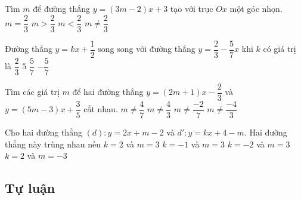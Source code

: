 \begin{bt}%
	Tìm $m$ để đường thẳng $y=(3m-2)x+3$ tạo với trục $Ox$ một góc nhọn.
	\choice
	{$m=\dfrac{2}{3}$}
	{\True $m>\dfrac{2}{3}$}
	{$m<\dfrac{2}{3}$}
	{$m \ne \dfrac{2}{3}$}
\end{bt}

\begin{bt}%
	Đường thẳng $y=kx+\dfrac{1}{2}$ song song với đường thẳng $y=\dfrac{2}{3}-\dfrac{5}{7}x$ khi $k$ có giá trị là
	\choice
	{$\dfrac{2}{3}$}
	{$5$}
	{$\dfrac{5}{7}$}
	{\True $-\dfrac{5}{7}$}
\end{bt}


\begin{bt}%
	Tìm các giá trị $m$ để hai đường thẳng $y=(2m+1)x-\dfrac{2}{3}$ và $y=(5m-3)x+\dfrac{3}{5}$ cắt nhau.	
	\choice
	{$m \ne \dfrac{4}{7}$}
	{\True$m \ne \dfrac{4}{3}$}
	{$m \ne \dfrac{-2}{7}$}
	{$m \ne \dfrac{-4}{3}$}
\end{bt}


\begin{bt}%
	Cho hai đường thẳng $(d) \colon y = 2x + m-2$  và $d' \colon y =  kx + 4-m$. Hai đường thẳng này trùng nhau nếu
	\choice
	{\True $k=2$ và $m=3$}
	{$k=-1$ và $m=3$}
	{$k=-2$ và $m=3$}
	{$k=2$ và $m=-3$}
\end{bt}
\subsection{Tự luận}
